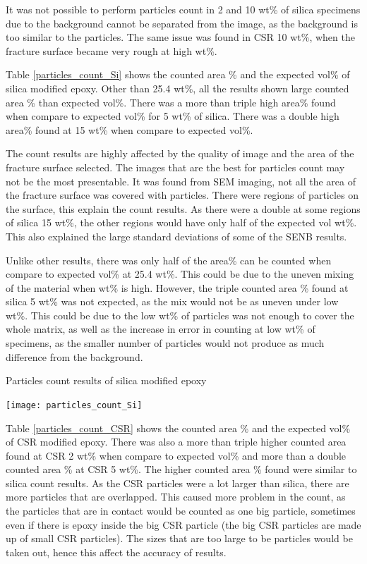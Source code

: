 \documentclass[numbers=noendperiod,chapterprefix=on]{icldt} %
\begin{document}
{It was not possible to perform particles count in 2 and 10 wt\% of silica specimens due to the background cannot be separated from the image, as the background is too similar to the particles. The same issue was found in CSR 10 wt\%, when the fracture surface became very rough at high wt\%.

Table \ref{particles_count_Si} shows the counted area \% and the expected vol\% of silica modified epoxy. 
Other than 25.4 wt\%, all the results shown large counted area \% than expected vol\%. 
There was a more than triple high area\% found when compare to expected vol\% for 5 wt\% of silica. 
There was a double high area\% found at 15 wt\% when compare to expected vol\%.

The count results are highly affected by the quality of image and the area of the fracture surface selected. The images that are the best for particles count may not be the most presentable. It was found from SEM imaging, not all the area of the fracture surface was covered with particles. There were regions of particles on the surface, this explain the count results. As there were a double at some regions of silica 15 wt\%, the other regions would have only half of the expected vol wt\%. This also explained the large standard deviations of some of the SENB results. 

Unlike other results, there was only half of the area\% can be counted when compare to expected vol\% at 25.4 wt\%. This could be due to the uneven mixing of the material when wt\% is high.  
However, the triple counted area \% found at silica 5 wt\% was not expected, as the mix would not be as uneven under low wt\%. This could be due to the low wt\% of particles was not enough to cover the whole matrix, as well as the increase in error in counting at low wt\% of specimens, as the smaller number of particles would not produce as much difference from the background. 

\begin{table}[!htpb]
\centering
\caption{Particles count results of silica modified epoxy} \label{particles_count_Si}
\texttt{[image: particles\_count\_Si]}
\end{table}
\FloatBarrier

Table \ref{particles_count_CSR} shows the counted area \% and the expected vol\% of CSR modified epoxy.
There was also a more than triple higher counted area found at CSR 2 wt\% when compare to expected vol\% and more than a double counted area \% at CSR 5 wt\%. The higher counted area \% found were similar to silica count results. 
As the CSR particles were a lot larger than silica, there are more particles that are overlapped. This caused more problem in the count, as the particles that are in contact would be counted as one big particle, sometimes even if there is epoxy inside the big CSR particle (the big CSR particles are made up of small CSR particles). The sizes that are too large to be particles would be taken out, hence this affect the accuracy of results.

}
\end{document}
